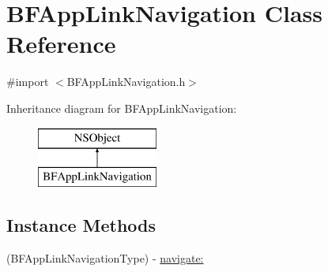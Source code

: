 \hypertarget{interface_b_f_app_link_navigation}{}\section{B\+F\+App\+Link\+Navigation Class Reference}
\label{interface_b_f_app_link_navigation}


{\ttfamily \#import $<$B\+F\+App\+Link\+Navigation.\+h$>$}

Inheritance diagram for B\+F\+App\+Link\+Navigation\+:\begin{figure}[H]
\begin{center}
\leavevmode
\includegraphics[height=2.000000cm]{interface_b_f_app_link_navigation}
\end{center}
\end{figure}
\subsection*{Instance Methods}
\begin{DoxyCompactItemize}
\item 
(B\+F\+App\+Link\+Navigation\+Type) -\/ \hyperlink{interface_b_f_app_link_navigation_a5a03d67d7fb455e69907574022316792}{navigate\+:}
\end{DoxyCompactItemize}
